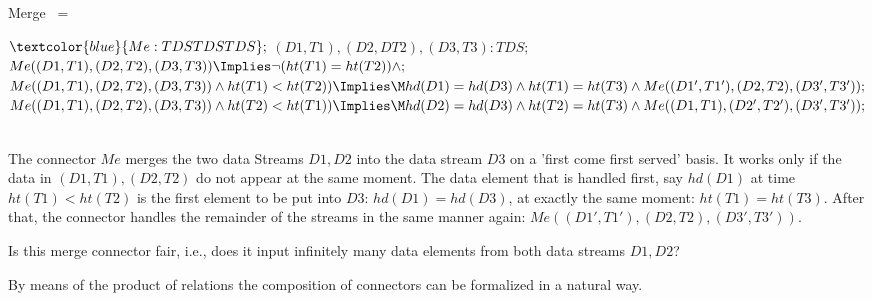 \documentclass[landscape, autoslides, light]{mmiss}
\newcommand{\vsp}{\pause\vspace{8mm}}
\begin{document}
\begin{Package}[Label={FSDPT}, Title={Formal Specification of Data and Process Types}, ShortTitle={FSDPT}, Authors={Horst Reichel}, Date={February 2003}, LevelOfDetail=Lecture, Language=en-GB]
\begin{Section}[Title={Final Coalgebras as Process Types}, Label={section4}]
\begin{Section}[Title={Behavioural Subtypes}, Label={section4_4}]
\begin{Paragraph}[Title={Comparing Time Streams}, Label=Paragraph138]
\end{Paragraph}
\begin{Paragraph}[Title={Timed Merging of TDS}, Label=Paragraph139]
\small\vspace{-5mm}
\begin{SpecDefn}{Merge} ~= 
\item[\Then] \item[\Cofree~\Group]
\begin{Items}
 \I\Pred \( \textcolor{blue}{Me : TDS \* TDS \* TDS };\)
 \I\Vars \( (D1,T1), (D2,DT2), (D3,T3) : TDS ; \)
 \I\Axioms \( Me((D1,T1),(D2,T2),(D3,T3)) \Implies \neg(ht(T1)=
 ht(T2)) \wedge  ; \)
 \\ \(Me((D1,T1),(D2,T2),(D3,T3)) \wedge ht(T1) < ht(T2)) \Implies
 \\ \M hd(D1) = hd(D3) \wedge ht(T1) = ht(T3) \wedge
 Me((D1',T1'),(D2,T2),(D3',T3')); \)
\\ \(Me((D1,T1),(D2,T2),(D3,T3)) \wedge ht(T2) < ht(T1)) \Implies
 \\ \M hd(D2) = hd(D3) \wedge ht(T2) = ht(T3) \wedge
 Me((D1,T1),(D2',T2'),(D3',T3')); \)
  ~\EndGroup \end{Items} \item[\End] \end{SpecDefn}

\end{Paragraph}
\begin{Paragraph}[Title={Timed Merging of TDS}, Label=Paragraph140]

The connector $Me$ merges the two data Streams $D1, D2$ into the
data stream $D3$ on a 'first come first served' basis. It works
only if the data in $(D1,T1), (D2,T2)$ do not appear at the same
moment. The data element that is handled first, say $hd(D1)$ at
time $ht(T1) < ht(T2)$ is the first element to be put into $D3$:
$hd(D1) = hd(D3)$, at exactly the same moment: $ht(T1) = ht(T3)$.
After that, the connector handles the remainder of the streams in
the same manner again: $Me((D1',T1'),(D2,T2),(D3',T3'))$.\vsp

Is this merge connector fair, i.e., does it input infinitely many
data elements from both data streams $D1, D2$?

\end{Paragraph}
\begin{Paragraph}[Title={Component Connectors}, Label=Paragraph141]

By means of the product of relations the composition  of
connectors can be formalized in a natural way.\vsp


\end{Paragraph}
\end{Section}
\end{Section}
\end{Package}
\end{document}
